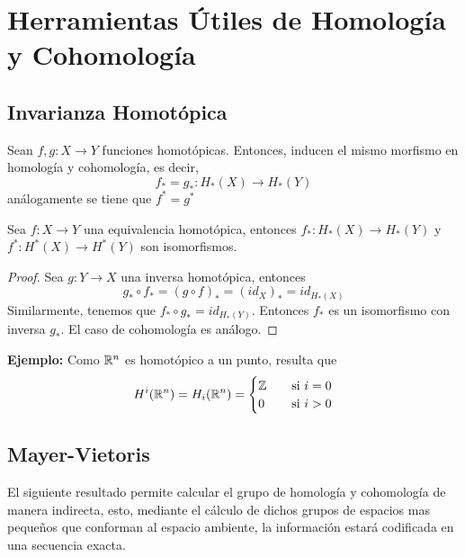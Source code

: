 \documentclass{article}
\begin{document}
\section{Herramientas Útiles de Homología y Cohomología}
\subsection{Invarianza Homotópica}
\begin{teo}
    Sean $f,g:X\to Y$ funciones homotópicas. Entonces, inducen el mismo morfismo en homología y
    cohomología, es decir,
    \begin{equation*}
        f_{*}=g_{*}:H_{*}(X)\to H_{*}(Y)
    \end{equation*}
    análogamente se tiene que $f^{*}=g^{*}$
\end{teo}

\begin{cor}
    Sea $f:X\to Y$ una equivalencia homotópica, entonces $f_{*}:H_{*}(X)\to H_{*}(Y)$ y 
    $f^{*}:H^{*}(X)\to H^{*}(Y)$ son isomorfismos.
\end{cor}
\begin{proof}
    Sea $g:Y\to X$ una inversa homotópica, entonces
    \begin{equation*}
        g_{*}\circ f_{*}=(g\circ f)_{*}=(id_{X})_{*}=id_{H_{*}(X)}
    \end{equation*}
    Similarmente, tenemos que $f_{*}\circ g_{*}=id_{H_{*}(Y)}$. Entonces $f_{*}$ es un isomorfismo
    con inversa $g_{*}$. El caso de cohomología es análogo.
\end{proof}

\noindent\textbf{Ejemplo:} Como $\mathbb{R}^{n}$ es homotópico a un punto, resulta que
\begin{equation*}
    H^{i}(\mathbb{R}^{n})=H_{i}(\mathbb{R}^{n})=\begin{cases}
        \mathbb{Z} &\quad\text{si }i=0 \\
        0 &\quad\text{si }i>0
    \end{cases}
\end{equation*}

\subsection{Mayer-Vietoris}
\noindent El siguiente resultado permite calcular el grupo de homología y cohomología de manera 
indirecta, esto, mediante el cálculo de dichos grupos de espacios mas pequeños que conforman al 
espacio ambiente, la información estará codificada en una secuencia exacta.
\end{document}
